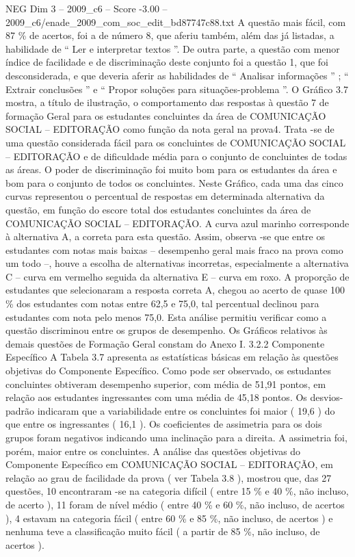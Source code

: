 \begin{textsample}{NEG Dim 3 – 2009\_c6 – Score -3.00 – 2009\_c6/enade\_2009\_com\_soc\_edit\_bd87747c88.txt}
A questão mais fácil, com 87 \% de acertos, foi a de número 8, que aferiu também, além das já listadas, a habilidade de “ Ler e interpretar textos ”.
De outra parte, a questão com menor índice de facilidade e de discriminação deste conjunto foi a questão 1, que foi desconsiderada, e que deveria aferir as habilidades de “ Analisar informações ” ; “ Extrair conclusões ” e “ Propor soluções para situações-problema ”.
O Gráfico 3.7 mostra, a título de ilustração, o comportamento das respostas à questão 7 de formação Geral para os estudantes concluintes da área de COMUNICAÇÃO SOCIAL – EDITORAÇÃO como função da nota geral na prova4.
Trata -se de uma questão considerada fácil para os concluintes de COMUNICAÇÃO SOCIAL – EDITORAÇÃO e de dificuldade média para o conjunto de concluintes de todas as áreas.
O poder de discriminação foi muito bom para os estudantes da área e bom para o conjunto de todos os concluintes.
Neste Gráfico, cada uma das cinco curvas representou o percentual de respostas em determinada alternativa da questão, em função do escore total dos estudantes concluintes da área de COMUNICAÇÃO SOCIAL – EDITORAÇÃO.
A curva azul marinho corresponde à alternativa A, a correta para esta questão.
Assim, observa -se que entre os estudantes com notas mais baixas – desempenho geral mais fraco na prova como um todo –, houve a escolha de alternativas incorretas, especialmente a alternativa C – curva em vermelho seguida da alternativa E – curva em roxo.
A proporção de estudantes que selecionaram a resposta correta A, chegou ao acerto de quase 100 \% dos estudantes com notas entre 62,5 e 75,0, tal percentual declinou para estudantes com nota pelo menos 75,0.
Esta análise permitiu verificar como a questão discriminou entre os grupos de desempenho.
Os Gráficos relativos às demais questões de Formação Geral constam do Anexo I. 3.2.2 Componente Específico A Tabela 3.7 apresenta as estatísticas básicas em relação às questões objetivas do Componente Específico.
Como pode ser observado, os estudantes concluintes obtiveram desempenho superior, com média de 51,91 pontos, em relação aos estudantes ingressantes com uma média de 45,18 pontos.
Os desvios-padrão indicaram que a variabilidade entre os concluintes foi maior ( 19,6 ) do que entre os ingressantes ( 16,1 ).
Os coeficientes de assimetria para os dois grupos foram negativos indicando uma inclinação para a direita.
A assimetria foi, porém, maior entre os concluintes.
A análise das questões objetivas do Componente Específico em COMUNICAÇÃO SOCIAL – EDITORAÇÃO, em relação ao grau de facilidade da prova ( ver Tabela 3.8 ), mostrou que, das 27 questões, 10 encontraram -se na categoria difícil ( entre 15 \% e 40 \%, não incluso, de acerto ), 11 foram de nível médio ( entre 40 \% e 60 \%, não incluso, de acertos ), 4 estavam na categoria fácil ( entre 60 \% e 85 \%, não incluso, de acertos ) e nenhuma teve a classificação muito fácil ( a partir de 85 \%, não incluso, de acertos ).

\end{textsample}
